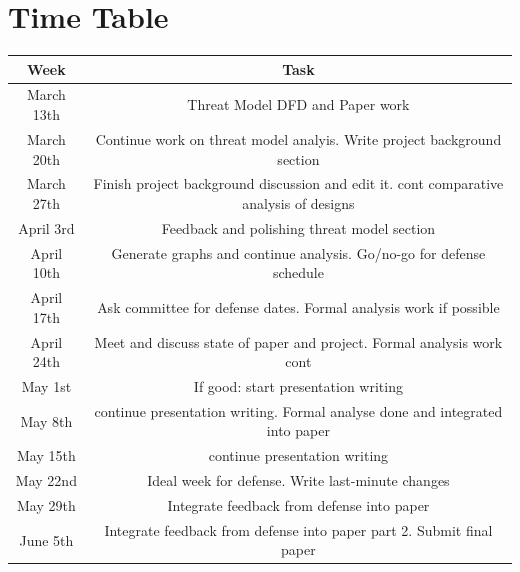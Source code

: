 \documentclass [11pt, proquest] {uwthesis}[2020/02/24]
\begin{document}
\section {Time Table}
\begin{center}
\begin{tabular}{ |c|c| } 
 \hline
Week & Task \\
 \hline
March 13th & Threat Model DFD and Paper work \\ 
  \hline
March 20th & Continue work on threat model analyis. Write project background section \\ 
  \hline
March 27th & Finish project background discussion and edit it. 
cont comparative analysis of designs   \\  
 \hline
April 3rd & Feedback and polishing threat model section  \\  
 \hline
April 10th & Generate graphs and continue analysis. Go/no-go for defense schedule  \\  
 \hline
April 17th & Ask committee for defense dates. Formal analysis work if possible \\  
 \hline
April 24th & Meet and discuss state of paper and project. Formal analysis work cont  \\  
 \hline
May 1st  & If good: start presentation writing  \\  
 \hline
May 8th  & continue presentation writing. Formal analyse done and integrated into paper  \\  
 \hline
May 15th  & continue presentation writing   \\  
 \hline
May 22nd  & Ideal week for defense. Write last-minute changes  \\  
 \hline
May 29th  & Integrate feedback from defense into paper  \\  
 \hline
June 5th  & Integrate feedback from defense into paper part 2. 
Submit final paper \\  
 \hline
 
\end{tabular}
\end{center}



\end{document}
